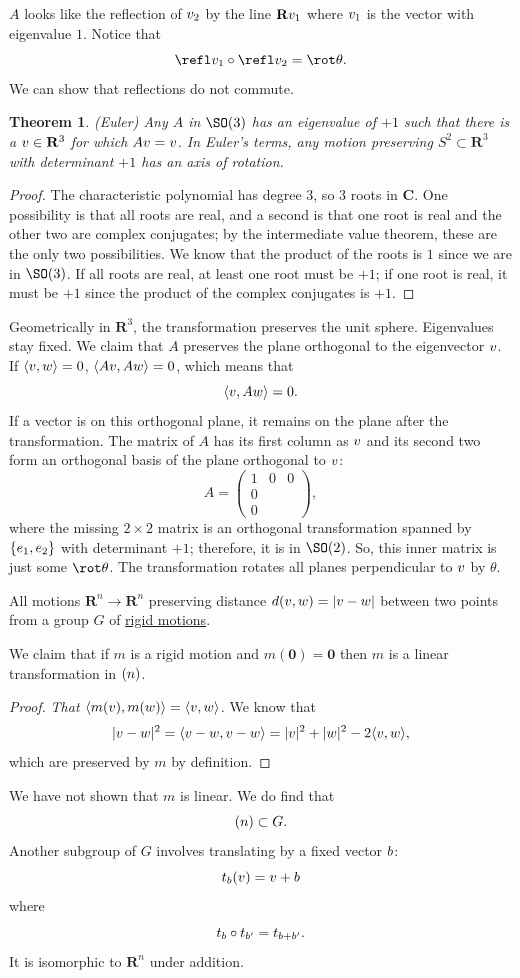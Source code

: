 \documentclass[11pt, oneside]{amsart}
\numberwithin{equation}{section}
\newtheorem{theorem}{Theorem}
\numberwithin{theorem}{section}
\theoremstyle{definition}
\let\O\relax
\let\bf\relax
\def\R{\mathbf{R}}
\def\C{\mathbf{C}}
\def\0{\mathbf{0}}
\begin{document}
$A$ looks like the reflection of $\bf{v}_2$ by the line $\R\bf v_1$ where $\bf v_1$ is the vector with eigenvalue $1$. Notice that 
$$
\refl \bf v_1 \circ \refl \bf v_2 = \rot\theta.
$$
We can show that reflections do not commute.
\begin{theorem}
(Euler) Any $A$ in $\SO(3)$ has an eigenvalue of $+1$ such that there is a $\bf v\in\R^3$ for which $A\bf v = \bf v$. In Euler's terms, any motion preserving $S^2 \subset \R^3$ with determinant $+1$ has an axis of rotation.
\end{theorem}
\begin{proof}
The characteristic polynomial has degree $3$, so $3$ roots in $\C$. One possibility is that all roots are real, and a second is that one root is real and the other two are complex conjugates; by the intermediate value theorem, these are the only two possibilities. We know that the product of the roots is $1$ since we are in $\SO(3)$. If all roots are real, at least one root must be $+1$; if one root is real, it must be $+1$ since the product of the complex conjugates is $+1$.
\end{proof}
Geometrically in $\R^3$, the transformation preserves the unit sphere. Eigenvalues stay fixed. We claim that $A$ preserves the plane orthogonal to the eigenvector $\bf v$. If $\langle\bf v, \bf w\rangle = 0$, $\langle A\bf v, A\bf w\rangle = 0$, which means that
$$
\langle\bf v,A \bf w\rangle = 0.
$$
If a vector is on this orthogonal plane, it remains on the plane after the transformation. The matrix of $A$ has its first column as $\bf v$ and its second two form an orthogonal basis of the plane orthogonal to $\bf v$:
$$
A = \left(\begin{array}{ccc} 1 &0&0\\ 0& &\\0&&\end{array}\right),
$$
where the missing $2\times 2$ matrix is an orthogonal transformation spanned by $\{\bf e_1,\bf e_2\}$ with determinant $+1$; therefore, it is in $\SO(2)$. So, this inner matrix is just some $\rot \theta$. The transformation rotates all planes perpendicular to $\bf v$ by $\theta$. 

All motions $\R^n\to\R^n$ preserving distance $d(\bf v,\bf w)=|\bf v-\bf w|$ between two points from a group $G$ of \underline{rigid motions}. 

We claim that if $m$ is a rigid motion and $m(\0)=\0$ then $m$ is a linear transformation in $\O(n)$.
\begin{proof}
\textit{That $\langle m(\bf v), m(\bf w) \rangle = \langle \bf v, \bf w \rangle$.} We know that 
$$
|\bf v - \bf w|^2 = \langle \bf v-\bf w, \bf v -\bf w \rangle = |\bf v|^2 + |\bf w|^2 - 2 \langle \bf v, \bf w \rangle,
$$
which are preserved by $m$ by definition.
\end{proof}
We have not shown that $m$ is linear. We do find that 
$$
\O(n)\subset G.
$$
Another subgroup of $G$ involves translating by a fixed vector $\bf b$:
$$
t_{\bf b}(\bf v) = \bf v + \bf b
$$
where 
$$
t_{\bf b} \circ t_{\bf b'} = t_{\bf b+\bf b'}.
$$
It is isomorphic to $\R^n$ under addition.
\end{document}

